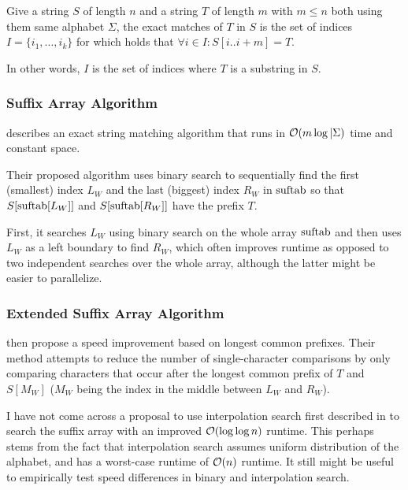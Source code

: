 \documentclass[a4paper,10pt]{article}
\begin{document}
Give a string $S$ of length $n$ and a string $T$ of length $m$ with $m
\le n$ both using them same alphabet $\Sigma$, the exact matches of $T$
in $S$ is the set of indices $I=\{i_1, \ldots, i_k\}$ for which holds
that $\forall i \in I: S[i..i+m]=T$.

In other words, $I$ is the set of indices where $T$ is a substring in $S$.

\subsubsection*{Suffix Array Algorithm}

\citealt{manber1993suffix} describes an exact string matching algorithm
that runs in ${\cal{O}}(m \log|\Sigma)$ time and constant space.

Their proposed algorithm uses binary search to sequentially find
the first (smallest) index $L_{W}$ and the last (biggest) index
$R_{W}$ in $\hbox{suftab}$ so that $S[\hbox{suftab}[L_{W}]]$ and
$S[\hbox{suftab}[R_{W}]]$ have the prefix $T$.

First, it searches $L_{W}$ using binary search on the whole array
$\hbox{suftab}$ and then uses $L_{W}$ as a left boundary to find $R_{W}$,
which often improves runtime as opposed to two independent searches
over the whole array, although the latter might be easier to parallelize.

\subsubsection*{Extended Suffix Array Algorithm}

\citealt{manber1993suffix} then propose a speed improvement based on
longest common prefixes. Their method attempts to reduce the number of
single-character comparisons by only comparing characters that occur
after the longest common prefix of $T$ and $S[M_{W}]$ ($M_{W}$ being
the index in the middle between $L_{W}$ and $R_{W}$).


I have not come across a proposal to use interpolation search first
described in \citealt{perl1978interpolation} to search the suffix array
with an improved ${\cal{O}}(\log \log n)$ runtime.  This perhaps stems
from the fact that interpolation search assumes uniform distribution of
the alphabet, and has a worst-case runtime of ${\cal{O}}(n)$ runtime. It
still might be useful to empirically test speed differences in binary
and interpolation search.
\end{document}
